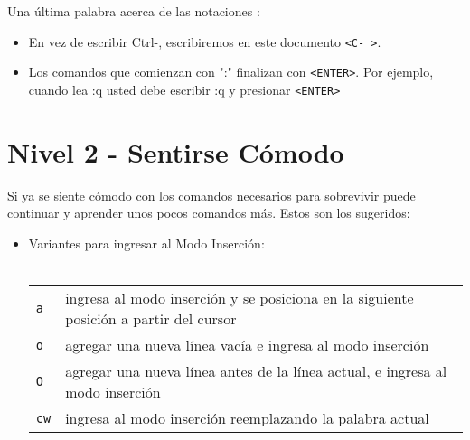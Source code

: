 

Una última palabra acerca de las notaciones :

\begin{itemize}
	\item En vez de escribir Ctrl-, escribiremos en este documento \texttt{<C- >}.
	\item Los comandos que comienzan con ":" finalizan con \texttt{<ENTER>}. Por ejemplo,
cuando lea :q usted debe escribir :q y presionar \texttt{<ENTER>}
\end{itemize}


\section{Nivel 2 - Sentirse Cómodo}


Si ya se siente cómodo con los comandos necesarios para sobrevivir 
puede continuar y aprender unos pocos comandos más. Estos son los sugeridos:


\begin{itemize}
	\item Variantes para ingresar al Modo Inserción: \\ \\
\begin{tabular}{ l l }
            \texttt{a} & ingresa al modo inserción y se posiciona en la siguiente posición a partir del cursor \\
            \texttt{o} & agregar una nueva línea vacía e ingresa al modo inserción \\
            \texttt{O} & agregar una nueva línea antes de la línea actual, e ingresa al modo inserción \\
            \texttt{cw} & ingresa al modo inserción reemplazando la palabra actual \\
\end{tabular}
\end{itemize}




